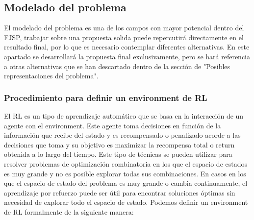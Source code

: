 \subsection{Modelado del problema}
El modelado del problema es una de los campos con mayor potencial dentro del FJSP, trabajar sobre una 
propuesta solida puede repercutirá directamente en el resultado final, por lo que es necesario
contemplar diferentes alternativas. En este apartado se desarrollará la propuesta final exclusivamente,
pero se hará referencia a otras alternativas que se han descartado dentro de la sección de "Posibles
representaciones del problema". 

\subsubsection{Procedimiento para definir un environment de RL}
El RL es un tipo de aprendizaje automático que se basa en la interacción de un agente con el environment. 
Este agente toma decisiones en función de la información que recibe del estado y es recompensado 
o penalizado acorde a las decisiones que toma y su objetivo es maximizar la recompensa total o return
obtenida a lo largo del tiempo. Este tipo de técnicas se pueden utilizar para resolver problemas de optimización 
combinatoria en los que el espacio de estados es muy grande y no es posible explorar todas sus combinaciones. 
En casos en los que el espacio de estado del problema es muy grande o cambia continuamente,
el aprendizaje por refuerzo puede ser útil para encontrar soluciones óptimas sin necesidad de
explorar todo el espacio de estado. Podemos definir un environment de RL formalmente de la siguiente manera:


